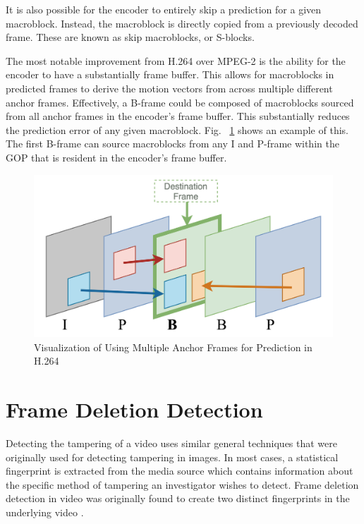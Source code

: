It is also possible for the encoder to entirely skip a prediction for a given macroblock. Instead, the macroblock is directly copied from a previously decoded frame. These are known as skip macroblocks, or S-blocks.

The most notable improvement from H.264 over MPEG-2 is the ability for the encoder to have a substantially frame buffer. This allows for macroblocks in predicted frames to derive the motion vectors from across multiple different anchor frames. Effectively, a B-frame could be composed of macroblocks sourced from all anchor frames in the encoder's frame buffer. This substantially reduces the prediction error of any given macroblock. Fig. ~\ref{multipred} shows an example of this. The first B-frame can source macroblocks from any I and P-frame within the GOP that is resident in the encoder's frame buffer.

\begin{figure}[htbp]
\centerline{\includegraphics[width=0.9\linewidth]{Background/multi_frame_pred.png}}
\caption{Visualization of Using Multiple Anchor Frames for Prediction in H.264}
\label{multipred}
\end{figure}

\section{Frame Deletion Detection}

Detecting the tampering of a video uses similar general techniques that were originally used for detecting tampering in images. In most cases, a statistical fingerprint is extracted from the media source which contains information about the specific method of tampering an investigator wishes to detect. Frame deletion detection in video was originally found to create two distinct fingerprints in the underlying video \cite{wang}. 

